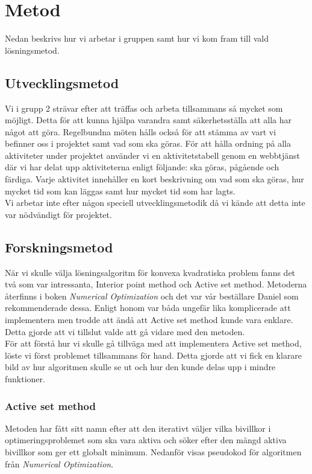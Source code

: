 \section{Metod}
Nedan beskrivs hur vi arbetar i gruppen samt hur vi kom fram till vald lösningsmetod. 

\subsection{Utvecklingsmetod}
Vi i grupp 2 strävar efter att träffas och arbeta tillsammans så mycket som möjligt. Detta för att kunna hjälpa varandra samt säkerhetsställa att alla har något att göra. Regelbundna möten hålls också för att stämma av vart vi befinner oss i projektet samt vad som ska göras. För att hålla ordning på alla aktiviteter under projektet använder vi en aktivitetstabell genom en webbtjänst där vi har delat upp aktiviteterna enligt följande: ska göras, pågående och färdiga. Varje aktivitet innehåller en kort beskrivning om vad som ska göras, hur mycket tid som kan läggas samt hur mycket tid som har lagts. 
\\
Vi arbetar inte efter någon speciell utvecklingsmetodik då vi kände att detta inte var nödvändigt för projektet.      

\subsection{Forskningsmetod}
När vi skulle välja lösningsalgoritm för konvexa kvadratiska problem fanns det två som var intressanta, Interior point method och Active set method. Metoderna återfinns i boken \emph{Numerical Optimization} och det var vår beställare Daniel som rekommenderade dessa. Enligt honom var båda ungefär lika komplicerade att implementera men trodde att ändå att Active set method kunde vara enklare. Detta gjorde att vi tillslut valde att gå vidare med den metoden. 
\\
För att förstå hur vi skulle gå tillväga med att implementera Active set method, löste vi först problemet tillsammans för hand. Detta gjorde att vi fick en klarare bild av hur algoritmen skulle se ut och hur den kunde delas upp i mindre funktioner.     

\subsubsection{Active set method}   
Metoden har fått sitt namn efter att den iterativt väljer vilka bivillkor i optimeringsproblemet som ska vara aktiva och söker efter den mängd aktiva bivillkor som ger ett globalt minimum. Nedanför visas pseudokod för algoritmen från \emph{Numerical Optimization}.

